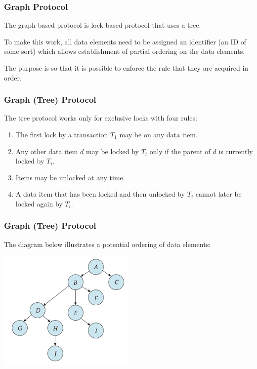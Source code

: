 \begin{frame}
\frametitle{Graph Protocol}

The graph based protocol is lock based protocol that uses a tree. 

To make this work, all data elements need to be assigned an identifier (an ID of some sort) which allows establishment of partial ordering on the data elements. 

The purpose is so that it is possible to enforce the rule that they are acquired in order.


\end{frame}

\begin{frame}
\frametitle{Graph (Tree) Protocol}

The tree protocol works only for exclusive locks with four rules:

\begin{enumerate}
	\item The first lock by a transaction $T_{1}$ may be on any data item.
	\item Any other data item $d$ may be locked by $T_{i}$ only if the parent of $d$ is currently locked by $T_{i}$.
	\item Items may be unlocked at any time.
	\item A data item that has been locked and then unlocked by $T_{i}$ cannot later be locked again by $T_{i}$.
\end{enumerate}

\end{frame}


\begin{frame}
\frametitle{Graph (Tree) Protocol}

The diagram below illustrates a potential ordering of data elements:

\begin{center}
\includegraphics[width=0.5\textwidth]{images/tree-lock}
\end{center}

\end{frame}


